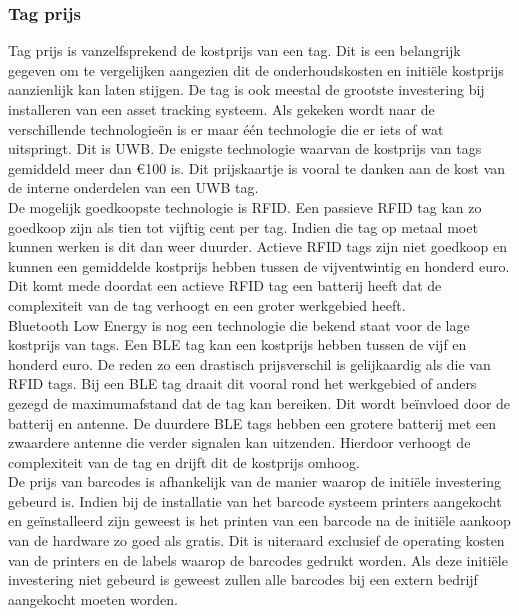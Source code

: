 \subsubsection{Tag prijs}
Tag prijs is vanzelfsprekend de kostprijs van een tag. Dit is een belangrijk gegeven om te vergelijken aangezien dit de onderhoudskosten en initiële kostprijs aanzienlijk kan laten stijgen. De tag is ook meestal de grootste investering bij installeren van een asset tracking systeem. Als gekeken wordt naar de verschillende technologieën is er maar één technologie die er iets of wat uitspringt. Dit is UWB. De enigste technologie waarvan de kostprijs van tags gemiddeld meer dan \euro100 is. Dit prijskaartje is vooral te danken aan de kost van de interne onderdelen van een UWB tag.\\

De mogelijk goedkoopste technologie is RFID. Een passieve RFID tag kan zo goedkoop zijn als tien tot vijftig cent per tag. Indien die tag op metaal moet kunnen werken is dit dan weer duurder. Actieve RFID tags zijn niet goedkoop en kunnen een gemiddelde kostprijs hebben tussen de vijventwintig en honderd euro. Dit komt mede doordat een actieve RFID tag een batterij heeft dat de complexiteit van de tag verhoogt en een groter werkgebied heeft.\\

Bluetooth Low Energy is nog een technologie die bekend staat voor de lage kostprijs van tags. Een BLE tag kan een kostprijs hebben tussen de vijf en honderd euro. De reden zo een drastisch prijsverschil is gelijkaardig als die van RFID tags. Bij een BLE tag draait dit vooral rond het werkgebied of anders gezegd de maximumafstand dat de tag kan bereiken. Dit wordt beïnvloed door de batterij en antenne. De duurdere BLE tags hebben een grotere batterij met een zwaardere antenne die verder signalen kan uitzenden. Hierdoor verhoogt de complexiteit van de tag en drijft dit de kostprijs omhoog.\\

De prijs van barcodes is afhankelijk van de manier waarop de initiële investering gebeurd is. Indien bij de installatie van het barcode systeem printers aangekocht en geïnstalleerd zijn geweest is het printen van een barcode na de initiële aankoop van de hardware zo goed als gratis. Dit is uiteraard exclusief de operating kosten van de printers en de labels waarop de barcodes gedrukt worden. Als deze initiële investering niet gebeurd is geweest zullen alle barcodes bij een extern bedrijf aangekocht moeten worden. \\

